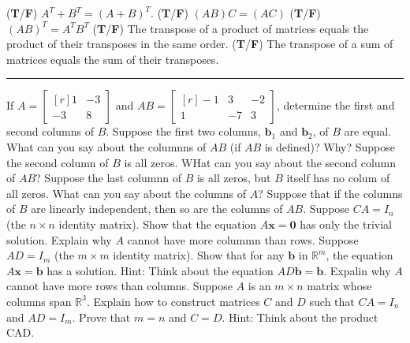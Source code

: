 \documentclass[11pt,answers]{exam} %
\renewcommand{\vec}[1]{\mathbf{#1}}
\newcommand{\mat}[1]{\begin{bmatrix*}[r] #1 \end{bmatrix*}}
\begin{document}
\begin{questions}
    \question (\textbf{T}/\textbf{F}) $A^T + B^T = \left(A+B\right)^T$.
    \question (\textbf{T}/\textbf{F}) $\left(AB\right)C = \left(AC\right)$
    \question (\textbf{T}/\textbf{F}) $\left(AB\right)^T = A^T B^T$
    \question (\textbf{T}/\textbf{F}) The transpose of a product of matrices equals the product of their transposes in the same order.
    \question (\textbf{T}/\textbf{F}) The transpose of a sum of matrices equals the sum of their transposes.
    \begin{center}\rule{4in}{0.1mm}\end{center}
    \question If $A = \mat{1 & -3 \\ -3 & 8}$ and $AB = \mat{-1 & 3 & -2 \\ 1 & -7 & 3}$, determine the first and second columns of $B$.
    \question Suppose the first two columns, $\vec{b}_1$ and $\vec{b}_2$, of $B$ are equal. What can you say about the columnns of $AB$ (if $AB$ is defined)? Why?
    \question Suppose the second column of $B$ is all zeros. WHat can you say about the second column of $AB$?
    \question Suppose the last columnn of $B$ is all zeros, but $B$ itself has no colum of all zeros. What can you say about the columns of $A$?
    \question Suppose that if the columns of $B$ are linearly independent, then so are the columns of $AB$.
    \question Suppose $CA = I_n$ (the $n \times n$ identity matrix). Show that the equation $A\vec{x}=\vec{0}$ has only the trivial solution. Explain why $A$ cannot have more colummn than rows.
    \question Suppose $AD = I_m$ (the $m \times m$ identity matrix). Show that for any $\vec{b}$ in $\mathbb{R}^m$, the equation $A\vec{x}=\vec{b}$ has a solution. Hint: Think about the equation $AD\vec{b}=\vec{b}$. Expalin why $A$ cannot have more rows than columns.
    \question Suppose $A$ is an $m \times n$ matrix whose columns span $\mathbb{R}^3$. Explain how to construct matrices $C$ and $D$ such that $CA = I_n$ and $AD = I_m$. Prove that $m=n$ and $C=D$. Hint: Think about the product CAD.


\end{questions} 
\end{document}
